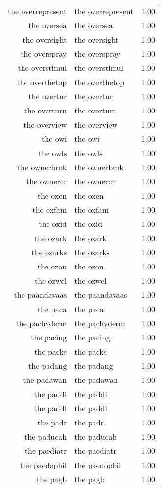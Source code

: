 \begin{table}[ht]
\begin{tabular}{rlr}
  the overrepresent & the overrepresent & 1.00 \\ 
  the oversea & the oversea & 1.00 \\ 
  the oversight & the oversight & 1.00 \\ 
  the overspray & the overspray & 1.00 \\ 
  the overstimul & the overstimul & 1.00 \\ 
  the overthetop & the overthetop & 1.00 \\ 
  the overtur & the overtur & 1.00 \\ 
  the overturn & the overturn & 1.00 \\ 
  the overview & the overview & 1.00 \\ 
  the owi & the owi & 1.00 \\ 
  the owls & the owls & 1.00 \\ 
  the ownerbrok & the ownerbrok & 1.00 \\ 
  the ownercr & the ownercr & 1.00 \\ 
  the oxen & the oxen & 1.00 \\ 
  the oxfam & the oxfam & 1.00 \\ 
  the oxid & the oxid & 1.00 \\ 
  the ozark & the ozark & 1.00 \\ 
  the ozarks & the ozarks & 1.00 \\ 
  the ozon & the ozon & 1.00 \\ 
  the ozwel & the ozwel & 1.00 \\ 
  the paandavaas & the paandavaas & 1.00 \\ 
  the paca & the paca & 1.00 \\ 
  the pachyderm & the pachyderm & 1.00 \\ 
  the pacing & the pacing & 1.00 \\ 
  the packs & the packs & 1.00 \\ 
  the padang & the padang & 1.00 \\ 
  the padawan & the padawan & 1.00 \\ 
  the paddi & the paddi & 1.00 \\ 
  the paddl & the paddl & 1.00 \\ 
  the padr & the padr & 1.00 \\ 
  the paducah & the paducah & 1.00 \\ 
  the paediatr & the paediatr & 1.00 \\ 
  the paedophil & the paedophil & 1.00 \\ 
  the pagb & the pagb & 1.00 \\ 

\end{tabular}
\end{table}
